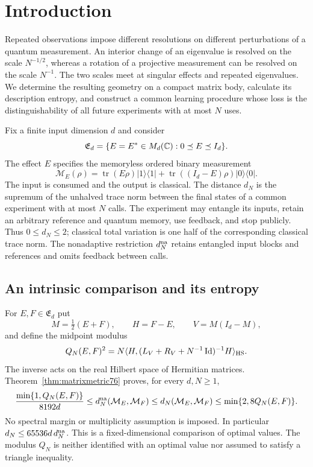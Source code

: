 \section{Introduction}

Repeated observations impose different resolutions on different
perturbations of a quantum measurement. An interior change of an
eigenvalue is resolved on the scale $N^{-1/2}$, whereas a rotation of
a projective measurement can be resolved on the scale $N^{-1}$.
The two scales meet at singular effects and repeated eigenvalues.
We determine the resulting geometry on a compact matrix body, calculate
its description entropy, and construct a common learning procedure
whose loss is the distinguishability of all future experiments with
at most $N$ uses.

Fix a finite input dimension $d$ and consider
\[
 \mathfrak E_d=\{E=E^*\in M_d(\mathbb C):0\preceq E\preceq I_d\}.
\]
The effect $E$ specifies the memoryless ordered binary measurement
\[
 \mathcal M_E(\rho)=\operatorname{tr}(E\rho)|1\rangle\langle1|
       +\operatorname{tr}((I_d-E)\rho)|0\rangle\langle0|.
\]
The input is consumed and the output is classical. The distance $d_N$
is the supremum of the unhalved trace norm between the final states
of a common experiment with at most $N$ calls. The experiment may
entangle its inputs, retain an arbitrary reference and quantum memory,
use feedback, and stop publicly. Thus $0\le d_N\le2$; classical total
variation is one half of the corresponding classical trace norm.
The nonadaptive restriction $d_N^{\rm na}$ retains entangled input
blocks and references and omits feedback between calls.

\subsection{An intrinsic comparison and its entropy}
For $E,F\in\mathfrak E_d$ put
\[
 M=\tfrac12(E+F),\qquad H=F-E,\qquad V=M(I_d-M),
\]
and define the midpoint modulus
\[
 Q_N(E,F)^2=N\langle H,
       (L_V+R_V+N^{-1}\operatorname{Id})^{-1}H\rangle_{\rm HS}.
\]
The inverse acts on the real Hilbert space of Hermitian matrices.
Theorem~\ref{thm:matrixmetric76} proves, for every $d,N\ge1$,
\begin{equation}\label{eq:intrometric77}
 \frac{\min\{1,Q_N(E,F)\}}{8192d}
 \le d_N^{\rm na}(\mathcal M_E,\mathcal M_F)
 \le d_N(\mathcal M_E,\mathcal M_F)
 \le\min\{2,8Q_N(E,F)\}.
\end{equation}
No spectral margin or multiplicity assumption is imposed. In particular
$d_N\le65536d\,d_N^{\rm na}$. This is a fixed-dimensional comparison
of optimal values. The modulus $Q_N$ is neither identified with an
optimal value nor assumed to satisfy a triangle inequality.

